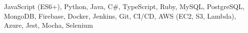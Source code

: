 \hspace{0.2in}JavaScript (ES6+), Python, Java, C\#, TypeScript,
Ruby, MySQL, PostgreSQL, MongoDB, Firebase, Docker, Jenkins,
Git, CI/CD, AWS (EC2, S3, Lambda), Azure, Jest, Mocha, Selenium
